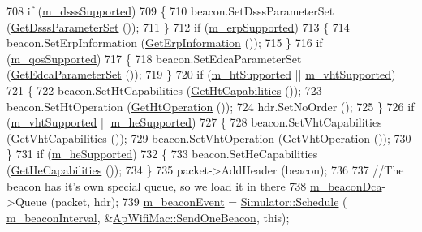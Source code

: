 \begin{DoxyCode}
708   \textcolor{keywordflow}{if} (\hyperlink{classns3_1_1RegularWifiMac_ab6ce267a1e23e9c1d84908e07831bd6d}{m\_dsssSupported})
709     \{
710       beacon.SetDsssParameterSet (\hyperlink{classns3_1_1ApWifiMac_a577723413f2a747d71ed01d8646ccc79}{GetDsssParameterSet} ());
711     \}
712   \textcolor{keywordflow}{if} (\hyperlink{classns3_1_1RegularWifiMac_ab90230e9a9ea6331758a53a316ee2b38}{m\_erpSupported})
713     \{
714       beacon.SetErpInformation (\hyperlink{classns3_1_1ApWifiMac_ae88a116a1cdc0895105765b2c27e2f1a}{GetErpInformation} ());
715     \}
716   \textcolor{keywordflow}{if} (\hyperlink{classns3_1_1RegularWifiMac_aeecdb918687493a8efdd70304bc0cee9}{m\_qosSupported})
717     \{
718       beacon.SetEdcaParameterSet (\hyperlink{classns3_1_1ApWifiMac_a6b29faae7352877a1aa97a2146725ff5}{GetEdcaParameterSet} ());
719     \}
720   \textcolor{keywordflow}{if} (\hyperlink{classns3_1_1RegularWifiMac_a8950c44b8cf2ad1f9274821cf88adc7b}{m\_htSupported} || \hyperlink{classns3_1_1RegularWifiMac_a151f330fdeb3f83f9ec7cf07537f0e86}{m\_vhtSupported})
721     \{
722       beacon.SetHtCapabilities (\hyperlink{classns3_1_1RegularWifiMac_ae2b0a52735a938a0f1ca233397ae2185}{GetHtCapabilities} ());
723       beacon.SetHtOperation (\hyperlink{classns3_1_1ApWifiMac_ae67f8b753332b379d189007ffee40733}{GetHtOperation} ());
724       hdr.SetNoOrder ();
725     \}
726   \textcolor{keywordflow}{if} (\hyperlink{classns3_1_1RegularWifiMac_a151f330fdeb3f83f9ec7cf07537f0e86}{m\_vhtSupported} || \hyperlink{classns3_1_1RegularWifiMac_a9458143c722fa0b6e5d223d41585842a}{m\_heSupported})
727     \{
728       beacon.SetVhtCapabilities (\hyperlink{classns3_1_1RegularWifiMac_ade487870f5663694d30a2dd6a7e614e8}{GetVhtCapabilities} ());
729       beacon.SetVhtOperation (\hyperlink{classns3_1_1ApWifiMac_afde045b9f011d312e3110bb5b9411403}{GetVhtOperation} ());
730     \}
731   \textcolor{keywordflow}{if} (\hyperlink{classns3_1_1RegularWifiMac_a9458143c722fa0b6e5d223d41585842a}{m\_heSupported})
732     \{
733       beacon.SetHeCapabilities (\hyperlink{classns3_1_1RegularWifiMac_aea22761a20fdff9f6c1a9acc49d63700}{GetHeCapabilities} ());
734     \}
735   packet->AddHeader (beacon);
736 
737   \textcolor{comment}{//The beacon has it's own special queue, so we load it in there}
738   \hyperlink{classns3_1_1ApWifiMac_a5eb69e654f0897d16c71e96bf168784d}{m\_beaconDca}->Queue (packet, hdr);
739   \hyperlink{classns3_1_1ApWifiMac_a9ba5983f49f1c44c2623ace4e463d3a0}{m\_beaconEvent} = \hyperlink{classns3_1_1Simulator_a671882c894a08af4a5e91181bf1eec13}{Simulator::Schedule} (
      \hyperlink{classns3_1_1ApWifiMac_a798e9c63c2c85d0973fd1456ffdd38e3}{m\_beaconInterval}, &\hyperlink{classns3_1_1ApWifiMac_a6c8cbc0fc95f3eaf4840d4ffcf78fac5}{ApWifiMac::SendOneBeacon}, \textcolor{keyword}{this});

\end{DoxyCode}
